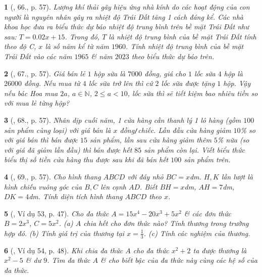 \documentclass{article}
\newtheorem{baitoan}{}
\begin{document}
\begin{baitoan}[\cite{SBT_Toan_7_Canh_Dieu_tap_2}, 66., p. 57]
	Lượng khí thải gây hiệu ứng nhà kính do các hoạt động của con người là nguyên nhân gây ra nhiệt độ Trái Đất tăng 1 cách đáng kể. Các nhà khoa học đưa ra biểu thức dự báo nhiệt độ trung bình trên bề mặt Trái Đất như sau: $T = 0.02x + 15$. Trong đó, $T$ là nhiệt độ trung bình của bề mặt Trái Đất tính theo độ \emph{C}, $x$ là số năm kể từ năm $1960$. Tính nhiệt độ trung bình của bề mặt Trái Đất vào các năm $1965$ \& năm $2023$ theo biểu thức dự báo trên.
\end{baitoan}

\begin{baitoan}[\cite{SBT_Toan_7_Canh_Dieu_tap_2}, 67., p. 57]
	Giá bán lẻ $1$ hộp sữa là $7000$ đồng, giá cho $1$ lốc sữa $4$ hộp là $26000$ đồng. Nếu mua từ $4$ lốc sữa trở lên thì cứ $2$ lốc sữa được tặng $1$ hộp. Vậy nếu bác Hoa mua $2a$, $a\in\mathbb{N}$, $2\le a < 10$, lốc sữa thì sẽ tiết kiệm bao nhiêu tiền so với mua lẻ từng hộp?
\end{baitoan}

\begin{baitoan}[\cite{SBT_Toan_7_Canh_Dieu_tap_2}, 68., p. 57]
	Nhân dịp cuối năm, 1 cửa hàng cần thanh lý 1 lô hàng (gồm $100$ sản phẩm cùng loại) với giá bán là $x$ \emph{đồng\texttt{/}chiếc}. Lần đầu cửa hàng giảm $10$\% so với giá bán thì bán được $15$ sản phẩm, lần sau cửa hàng giảm thêm $5$\% nữa (so với giá đã giảm lần đầu) thì bán được hết $85$ sản phẩm còn lại. Viết biểu thức biểu thị số tiền cửa hàng thu được sau khi đã bán hết $100$ sản phẩm trên.
\end{baitoan}

\begin{baitoan}[\cite{SBT_Toan_7_Canh_Dieu_tap_2}, 69., p. 57]
	Cho hình thang $ABCD$ với đáy nhỏ $BC = x$\emph{dm}. $H,K$ lần lượt là hình chiếu vuông góc của $B,C$ lên cạnh $AD$. Biết $BH = x$\emph{dm}, $AH = 7$\emph{dm}, $DK = 4$\emph{dm}. Tính diện tích hình thang $ABCD$ theo $x$.
\end{baitoan}

\begin{baitoan}[\cite{Tuyen_Toan_7}, Ví dụ 53, p. 47]
	Cho đa thức $A = 15x^4 - 20x^3 + 5x^2$ \& các đơn thức $B = 2x^3$, $C = 5x^2$. (a) $A$ chia hết cho đơn thức nào? Tính thương trong trường hợp đó. (b) Tính giá trị của thương tại $x = \frac{1}{3}$. (c) Tính các nghiệm của thương.
\end{baitoan}

\begin{baitoan}[\cite{Tuyen_Toan_7}, Ví dụ 54, p. 48]
	Khi chia đa thức $A$ cho đa thức $x^2 + 2$ ta được thương là $x^2 - 5$ \& dư $9$. Tìm đa thức $A$ \& cho biết bậc của đa thức này cùng các hệ số của đa thức.
\end{baitoan}
\end{document}
